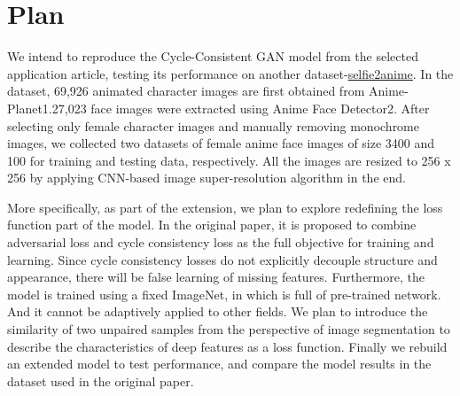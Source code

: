 \section{Plan}

We intend to reproduce the Cycle-Consistent GAN model from the selected application article, testing its performance on another dataset-\href{https://paperswithcode.com/dataset/selfie2anime}{selfie2anime}.
In the dataset, 69,926 animated character images are first obtained from Anime-Planet1.27,023 face images were extracted using Anime Face Detector2. 
After selecting only female character images and manually removing monochrome images, we collected two datasets of female anime face images of size 3400 and 100 for training and testing data, respectively. 
All the images are resized to 256 x 256 by applying CNN-based image super-resolution algorithm in the end.

More specifically, as part of the extension, we plan to explore redefining the loss function part of the model. 
In the original paper, it is proposed to combine adversarial loss and cycle consistency loss as the full objective for training and learning. 
Since cycle consistency losses do not explicitly decouple structure and appearance, there will be false learning of missing features. 
Furthermore, the model is trained using a fixed ImageNet, in which is full of pre-trained network. 
And it cannot be adaptively applied to other fields. 
We plan to introduce the similarity of two unpaired samples from the perspective of image segmentation to describe the characteristics of deep features as a loss function. 
Finally we rebuild an extended model to test performance, and compare the model results in the dataset used in the original paper.
